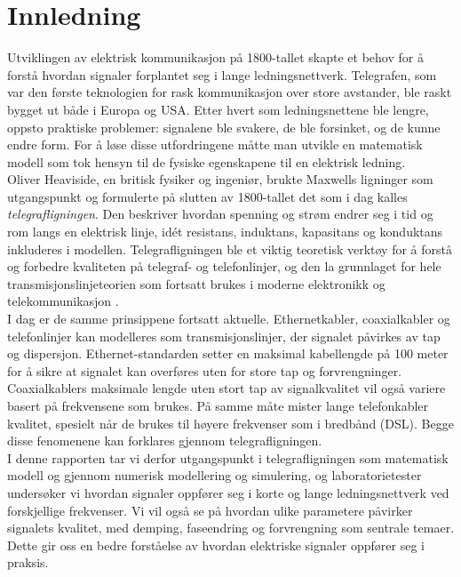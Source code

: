 \section{Innledning}

Utviklingen av elektrisk kommunikasjon på 1800-tallet skapte et behov for å forstå hvordan 
signaler forplantet seg i lange ledningsnettverk. Telegrafen, som var den første teknologien 
for rask kommunikasjon over store avstander, ble raskt bygget ut både i Europa og USA. Etter hvert 
som ledningsnettene ble lengre, oppsto praktiske problemer: signalene ble svakere, de ble 
forsinket, og de kunne endre form. For å løse disse utfordringene måtte man utvikle en matematisk 
modell som tok hensyn til de fysiske egenskapene til en elektrisk ledning.
\\[1em]
Oliver Heaviside, en britisk fysiker og ingeniør, brukte Maxwells ligninger som utgangspunkt og 
formulerte på slutten av 1800-tallet det som i dag kalles \textit{telegrafligningen}. Den beskriver 
hvordan spenning og strøm endrer seg i tid og rom langs en elektrisk linje, idét 
resistans, induktans, kapasitans og konduktans inkluderes i modellen. Telegrafligningen ble et viktig teoretisk verktøy 
for å forstå og forbedre kvaliteten på telegraf- og telefonlinjer, og den la grunnlaget for hele 
transmisjonslinjeteorien som fortsatt brukes i moderne elektronikk og telekommunikasjon \cite{geeksforgeeks_telegrapher}.
\\[1em]
I dag er de samme prinsippene fortsatt aktuelle. Ethernetkabler, coaxialkabler og telefonlinjer kan modelleres 
som transmisjonslinjer, der signalet påvirkes av tap og dispersjon. Ethernet-standarden setter en 
maksimal kabellengde på 100 meter for å sikre at signalet kan overføres uten for store tap og 
forvrengninger. Coaxialkablers maksimale lengde uten stort tap av signalkvalitet vil også variere basert på frekvensene som brukes. På samme måte mister lange telefonkabler kvalitet, spesielt når de brukes til høyere 
frekvenser som i bredbånd (DSL). Begge disse fenomenene kan forklares gjennom telegrafligningen.
\\[1em]
I denne rapporten tar vi derfor utgangspunkt i telegrafligningen som matematisk modell og gjennom numerisk
modellering og simulering, og laboratorietester undersøker vi hvordan signaler oppfører seg i korte og 
lange ledningsnettverk ved forskjellige frekvenser. Vi vil også se på hvordan ulike parametere påvirker 
signalets kvalitet, med demping, faseendring og forvrengning som sentrale temaer. Dette gir oss en bedre forståelse av
hvordan elektriske signaler oppfører seg i praksis. 